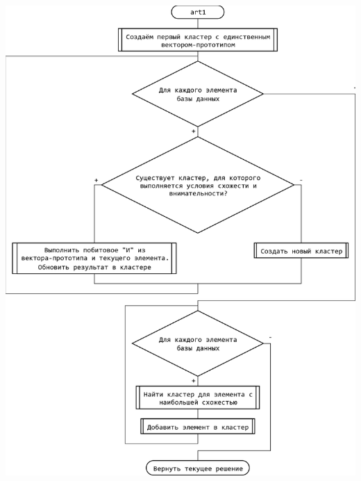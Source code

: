 \documentclass[a4paper,14pt]{extarticle}
\begin{document}
\includegraphics[width=140mm]{algorythm}\\
\end{document}
